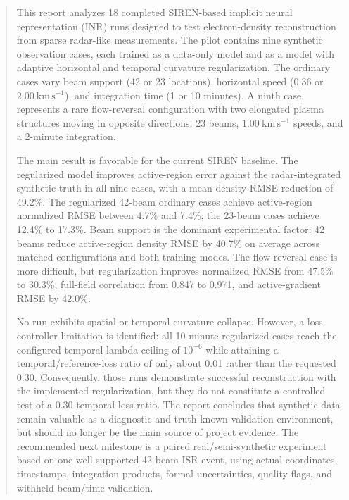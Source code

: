 \documentclass[11pt]{article}
\newcommand{\kmps}{\mathrm{km\,s^{-1}}}
\begin{document}
\begin{abstract}
This report analyzes 18 completed SIREN-based implicit neural representation (INR) runs designed to
test electron-density reconstruction from sparse radar-like measurements. The pilot contains nine
synthetic observation cases, each trained as a data-only model and as a model with adaptive horizontal
and temporal curvature regularization. The ordinary cases vary beam support (42 or 23 locations),
horizontal speed (0.36 or $2.00~\kmps$), and integration time (1 or 10 minutes). A ninth case represents
a rare flow-reversal configuration with two elongated plasma structures moving in opposite directions,
23 beams, $1.00~\kmps$ speeds, and a 2-minute integration.

The main result is favorable for the current SIREN baseline. The regularized model improves active-region
error against the radar-integrated synthetic truth in all nine cases, with a mean density-RMSE reduction of
49.2\%. The regularized 42-beam ordinary cases achieve active-region normalized RMSE between 4.7\% and
7.4\%; the 23-beam cases achieve 12.4\% to 17.3\%. Beam support is the dominant experimental factor:
42 beams reduce active-region density RMSE by 40.7\% on average across matched configurations and both
training modes. The flow-reversal case is more difficult, but regularization improves normalized RMSE from
47.5\% to 30.3\%, full-field correlation from 0.847 to 0.971, and active-gradient RMSE by 42.0\%.

No run exhibits spatial or temporal curvature collapse. However, a loss-controller limitation is identified:
all 10-minute regularized cases reach the configured temporal-lambda ceiling of $10^{-6}$ while attaining a
temporal/reference-loss ratio of only about 0.01 rather than the requested 0.30. Consequently, those runs
demonstrate successful reconstruction with the implemented regularization, but they do not constitute a
controlled test of a 0.30 temporal-loss ratio. The report concludes that synthetic data remain valuable as
a diagnostic and truth-known validation environment, but should no longer be the main source of project
evidence. The recommended next milestone is a paired real/semi-synthetic experiment based on one well-supported
42-beam ISR event, using actual coordinates, timestamps, integration products, formal uncertainties, quality
flags, and withheld-beam/time validation.
\end{abstract}

\tableofcontents
\listoffigures
\listoftables
\newpage
\end{document}
